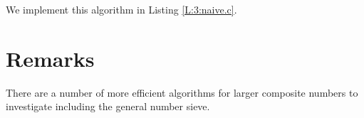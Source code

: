 \documentclass[oneside,12pt]{book}   	%
\newcounter{ex}
\newcounter{pr}
\theoremstyle{definition}
\begin{document}
\begin{spacing}{1.618}
			We implement this algorithm in Listing \ref{L:3:naive.c}. 
			
			
		
		\section{Remarks}
		
			There are a number of more efficient algorithms for larger composite numbers to investigate including the general number sieve. 

	

		
	\printindex
\end{spacing}
\end{document}
